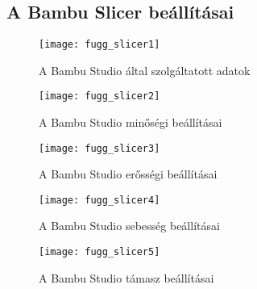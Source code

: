 \appendix
\chapter*{\fuggelek}
\setcounter{chapter}{\appendixnumber}

\section{A Bambu Slicer beállításai}\label{sec:slicerbeallitasok}

\begin{figure}[h!]
	\centering
	\texttt{[image: fugg\_slicer1]}
	\caption{A Bambu Studio által szolgáltatott adatok}
	
\end{figure}

\begin{figure}[h!]
	\centering
	\texttt{[image: fugg\_slicer2]}
	\caption{A Bambu Studio minőségi beállításai}
\end{figure}


\begin{figure}[h!]
	\centering
	\texttt{[image: fugg\_slicer3]}
	\caption{A Bambu Studio erősségi beállításai}
\end{figure}

\begin{figure}[h!]
	\centering
	\texttt{[image: fugg\_slicer4]}
	\caption{A Bambu Studio sebesség beállításai}
	
\end{figure}

\begin{figure}[h!]
	\centering
	\texttt{[image: fugg\_slicer5]}
	\caption{A Bambu Studio támasz beállításai}
	
\end{figure}